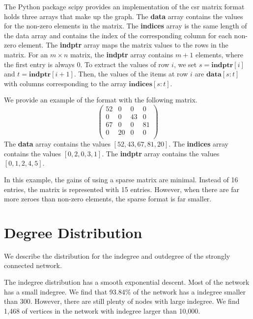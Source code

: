 \documentclass{article}
\begin{document}
The Python package scipy provides an implementation of the csr matrix format holds three arrays that make up the graph.
\autocite{scipy_doc}
The \textbf{data} array contains the values for the non-zero elements in the matrix.
The \textbf{indices} array is the same length of the data array and contains the index of the corresponding column for each non-zero element.
The \textbf{indptr} array maps the matrix values to the rows in the matrix.
For an $m\times n$ matrix, the \textbf{indptr} array contains $m+1$ elements, where the first entry is always 0.
To extract the values of row $i$, we set $s = \textbf{indptr}[i]$ and $t = \textbf{indptr}[i+1]$. Then, the values of the items at row $i$ are $\textbf{data}[s:t]$ with columns corresponding to the array $\textbf{indices}[s:t]$. 


We provide an example of the format with the following matrix.
\begin{equation*}
    \begin{pmatrix}
        52 & 0  & 0  & 0  \\
        0  & 0  & 43 & 0  \\
        67 & 0  & 0  & 81  \\
        0  & 20 & 0  & 0  \\
    \end{pmatrix}
\end{equation*}
The \textbf{data} array contains the values $[52, 43, 67, 81, 20]$. The \textbf{indices} array contains the values $[0, 2, 0, 3, 1]$.
The \textbf{indptr} array contains the values $[0, 1, 2, 4, 5]$.

In this example, the gains of using a sparse matrix are minimal. Instead of 16 entries, the matrix is represented with 15 entries. However, when there are far more zeroes than non-zero elements, the sparse format is far smaller.



\section{Degree Distribution}

We describe the distribution for the indegree and outdegree of the strongly connected network.


The indegree distribution has a smooth exponential descent. Most of the network has a small indegree. We find that 93.84\% of the network has a indegree smaller than 300. However, there are still plenty of nodes with large indegree. We find 1,468 of vertices in the network with indegree larger than 10,000.
\end{document}
